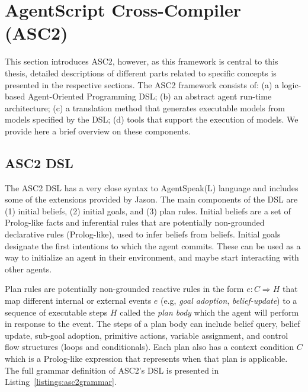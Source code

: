 \section{AgentScript Cross-Compiler (ASC2)}
This section introduces ASC2, however, as this framework is central to this thesis, detailed descriptions of different parts related to specific concepts is presented in the respective sections. The ASC2 framework consists of: (a) a logic-based Agent-Oriented Programming DSL; (b) an abstract agent run-time architecture; (c) a translation method that generates executable models from models specified by the DSL; (d) tools that support the execution of models. We provide here a brief overview on these components.

\subsection{ASC2 DSL}
\label{section_dsl}

The ASC2 DSL has a very close syntax to AgentSpeak(L) language and includes some of the extensions provided by Jason. The main components of the DSL are (1) initial beliefs, (2) initial goals, and (3) plan rules. Initial beliefs are a set of Prolog-like facts and inferential rules that are potentially non-grounded declarative rules (Prolog-like), used to infer beliefs from beliefs. Initial goals designate the first intentions to which the agent commits. These can be used as a way to initialize an agent in their environment, and maybe start interacting with other agents. 

Plan rules are potentially non-grounded reactive rules in the form $e : C \Rightarrow H$ that map different internal or external events $e$ (e.g, \textit{goal adoption}, \textit{belief-update}) to a sequence of executable steps $H$ called the \textit{plan body} which the agent will perform in response to the event. The steps of a plan body can include belief query, belief update, sub-goal adoption, primitive actions, variable assignment, and control flow structures (loops and conditionals). Each plan also has a context condition $C$ which is a Prolog-like expression that represents when that plan is applicable. The full grammar definition of ASC2's DSL is presented in Listing~\ref{listings:asc2grammar}.

